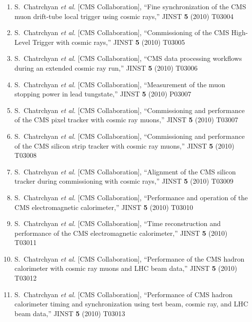 \documentclass[10pt]{letter}
\begin{document}
\begin{enumerate}
\item S.~Chatrchyan {\it et al.}  [CMS Collaboration],
  ``Fine synchronization of the CMS muon drift-tube local trigger using cosmic rays,''
  JINST {\bf 5} (2010) T03004

\item S.~Chatrchyan {\it et al.}  [CMS Collaboration],
  ``Commissioning of the CMS High-Level Trigger with cosmic rays,''
  JINST {\bf 5} (2010) T03005

\item S.~Chatrchyan {\it et al.}  [CMS Collaboration],
  ``CMS data processing workflows during an extended cosmic ray run,''
  JINST {\bf 5} (2010) T03006

\item S.~Chatrchyan {\it et al.}  [CMS Collaboration],
  ``Measurement of the muon stopping power in lead tungstate,''
  JINST {\bf 5} (2010) P03007

\item S.~Chatrchyan {\it et al.}  [CMS Collaboration],
  ``Commissioning and performance of the CMS pixel tracker with cosmic ray muons,''
  JINST {\bf 5} (2010) T03007

\item S.~Chatrchyan {\it et al.}  [CMS Collaboration],
  ``Commissioning and performance of the CMS silicon strip tracker with cosmic ray muons,''
  JINST {\bf 5} (2010) T03008

\item S.~Chatrchyan {\it et al.}  [CMS Collaboration],
  ``Alignment of the CMS silicon tracker during commissioning with cosmic rays,''
  JINST {\bf 5} (2010) T03009

\item S.~Chatrchyan {\it et al.}  [CMS Collaboration],
  ``Performance and operation of the CMS electromagnetic calorimeter,''
  JINST {\bf 5} (2010) T03010

\item S.~Chatrchyan {\it et al.}  [CMS Collaboration],
  ``Time reconstruction and performance of the CMS electromagnetic calorimeter,''
  JINST {\bf 5} (2010) T03011

\item S.~Chatrchyan {\it et al.}  [CMS Collaboration],
  ``Performance of the CMS hadron calorimeter with cosmic ray muons and LHC beam data,''
  JINST {\bf 5} (2010) T03012

\item S.~Chatrchyan {\it et al.}  [CMS Collaboration],
  ``Performance of CMS hadron calorimeter timing and synchronization using test beam, cosmic ray, and LHC beam data,''
  JINST {\bf 5} (2010) T03013


\end{enumerate}
\end{document}
